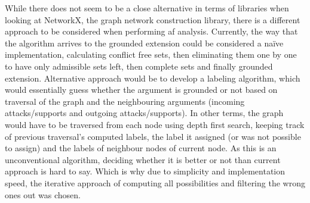         While there does not seem to be a close alternative in terms of libraries when looking at NetworkX, the graph network construction library, there is a different approach to be considered when performing \gls{af} analysis. Currently, the way that the algorithm arrives to the grounded extension could be considered a na\"ive implementation, calculating conflict free sets, then eliminating them one by one to have only admissible sets left, then complete sets and finally grounded extension. Alternative approach would be to develop a labeling algorithm, which would essentially guess whether the argument is grounded or not based on traversal of the graph and the neighbouring arguments (incoming attacks/supports and outgoing attacks/supports). In other terms, the graph would have to be traversed from each node using depth first search, keeping track of previous traversal's computed labels, the label it assigned (or was not possible to assign) and the labels of neighbour nodes of current node. As this is an unconventional algorithm, deciding whether it is better or not than current approach is hard to say. Which is why due to simplicity and implementation speed, the iterative approach of computing all possibilities and filtering the wrong ones out was chosen.